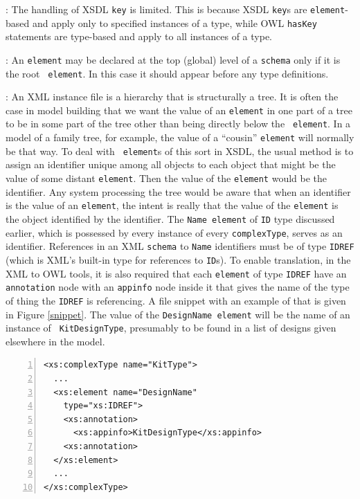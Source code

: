 \documentclass[preprint,12pt]{elsarticle}
\newenvironment{mylisting}
{\begin{list}{}{\setlength{\leftmargin}{1em}}\item\small}
{\end{list}}
\begin{document}
\begin{description}
\item [Handling of Key Limited]: The handling of XSDL {\tt key} is limited.
  This is because XSDL {\tt key}s are {\tt element}-based and apply only to
  specified instances of a type, while OWL {\tt hasKey} statements are
  type-based and apply to all instances of a type.

\item [Global Element Only for Root]: An {\tt element} may be declared at
  the top (global) level of a {\tt schema} only if it is the root {\tt
    element}. In this case it should appear before any type definitions.

\item [Specialized Use of ID and IDREF]: An XML instance file is a
  hierarchy that is structurally a tree. It is often the case in model
  building that we want the value of an {\tt element} in one part of a tree
  to be in some part of the tree other than being directly below the {\tt
    element}. In a model of a family tree, for example, the value of a
  “cousin” {\tt element} will normally be that way. To deal with {\tt
    element}s of this sort in XSDL, the usual method is to assign an
  identifier unique among all objects to each object that might be the
  value of some distant {\tt element}. Then the value of the {\tt element}
  would be the identifier. Any system processing the tree would be aware
  that when an identifier is the value of an {\tt element}, the intent is
  really that the value of the {\tt element} is the object identified by
  the identifier. The {\tt Name element} of {\tt ID} type discussed
  earlier, which is possessed by every instance of every {\tt complexType},
  serves as an identifier. References in an XML {\tt schema} to {\tt Name}
  identifiers must be of type {\tt IDREF} (which is XML's built-in type for
  references to {\tt ID}s). To enable translation, in the XML to OWL tools,
  it is also required that each {\tt element} of type {\tt IDREF} have an
  {\tt annotation} node with an {\tt appinfo} node inside it that gives the
  name of the type of thing the {\tt IDREF} is referencing. A file snippet
  with an example of that is given in Figure \ref{snippet}. The value of the
  {\tt DesignName element} will be the name of an instance of {\tt
    KitDesignType}, presumably to be found in a list of designs given
  elsewhere in the model.



\begin{mylisting}
\begin{Verbatim}[commandchars=\\\{\},numbers=left, numbersep=1pt]
<xs:complexType name="KitType">
  ...
  <xs:element name="DesignName"
    type="xs:IDREF">
    <xs:annotation>
      <xs:appinfo>KitDesignType</xs:appinfo>
    <xs:annotation>
  </xs:element>
  ...
</xs:complexType>
\end{Verbatim}
\label{snippet}
\end{mylisting}


\end{description}
\end{document}

